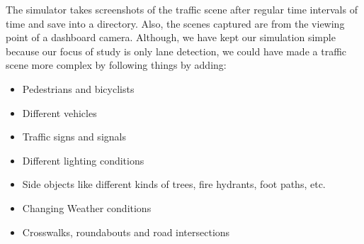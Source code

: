 The simulator takes screenshots of the traffic scene after regular time intervals of time and save into a directory. Also, the scenes captured are from the viewing point of a dashboard camera. Although, we have kept our simulation simple because our focus of study is only lane detection, we could have made a traffic scene more complex by following things by adding:
\begin{itemize}
  \item Pedestrians and bicyclists
  \item Different vehicles
  \item Traffic signs and signals
  \item Different lighting conditions
  \item Side objects like different kinds of trees, fire hydrants, foot paths, etc.
  \item Changing Weather conditions
  \item Crosswalks, roundabouts and road intersections
\end{itemize}

